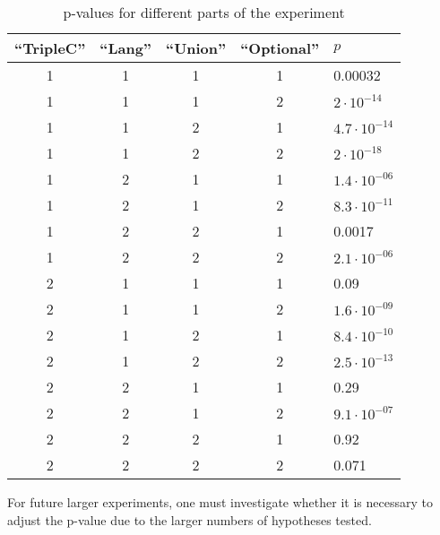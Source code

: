 \documentclass{article}
\begin{document}
\begin{table}[ht]
\begin{center}
\caption{p-values for different parts of the experiment}\label{tab:pvaluesfull}
\begin{tabular}{ccccl}
  \hline
``TripleC'' & ``Lang'' & ``Union'' & ``Optional'' & $p$ \\ 
  \hline
  1 & 1 & 1 & 1 & 0.00032 \\ 
  1 & 1 & 1 & 2 & $2 \cdot 10^{-14}$ \\ 
  1 & 1 & 2 & 1 & $4.7 \cdot 10^{-14}$ \\ 
  1 & 1 & 2 & 2 & $2 \cdot 10^{-18}$ \\ 
  1 & 2 & 1 & 1 & $1.4 \cdot 10^{-06}$ \\ 
  1 & 2 & 1 & 2 & $8.3 \cdot 10^{-11}$ \\ 
  1 & 2 & 2 & 1 & 0.0017 \\ 
  1 & 2 & 2 & 2 & $2.1 \cdot 10^{-06}$ \\ 
  2 & 1 & 1 & 1 & 0.09 \\ 
  2 & 1 & 1 & 2 & $1.6 \cdot 10^{-09}$ \\ 
  2 & 1 & 2 & 1 & $8.4 \cdot 10^{-10}$ \\ 
  2 & 1 & 2 & 2 & $2.5 \cdot 10^{-13}$ \\ 
  2 & 2 & 1 & 1 & 0.29 \\ 
  2 & 2 & 1 & 2 & $9.1 \cdot 10^{-07}$ \\ 
  2 & 2 & 2 & 1 & 0.92 \\ 
  2 & 2 & 2 & 2 & 0.071 \\ 
   \hline
\end{tabular}
\end{center}
\end{table}


For future larger experiments, one must investigate whether it is
necessary to adjust the p-value due to the larger numbers of
hypotheses tested.
\end{document}
